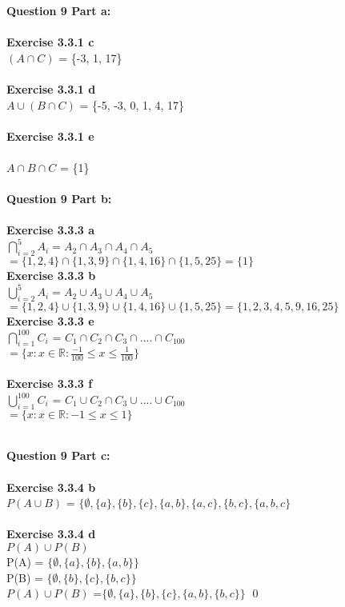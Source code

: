 \documentclass[11pt]{article}
\begin{document}
\noindent \textbf{Question 9 Part a:}\\\\
\textbf{Exercise 3.3.1 c }\\
$(A \cap C)$ = \{-3, 1, 17\}\\\\
\textbf{Exercise 3.3.1 d }\\
$A \cup (B \cap C)$ = \{-5, -3, 0, 1, 4, 17\}\\\\
\textbf{Exercise 3.3.1 e }\\\\
$A \cap B \cap C$ = \{1\}\\\\
\noindent \textbf{Question 9 Part b:}\\\\
\textbf{Exercise 3.3.3 a }\\
$\bigcap ^5_{i=2} A_i = A_2 \cap A_3 \cap A_4 \cap A_5$\\
$=\{1, 2, 4\} \cap \{1, 3, 9\} \cap \{1, 4, 16\} \cap \{1, 5, 25\} = \{1\}$\\
\textbf{Exercise 3.3.3 b }\\
$\bigcup ^5_{i=2} A_i = A_2 \cup A_3 \cup A_4 \cup A_5$\\
$=\{1, 2, 4\} \cup \{1, 3, 9\} \cup \{1, 4, 16\} \cup \{1, 5, 25\} = \{1, 2, 3, 4, 5, 9, 16, 25\}$\\
\textbf{Exercise 3.3.3 e }\\
$\bigcap^{100}_{i=1}C_i$ = $C_1 \cap C_2 \cap C_3 \cap .... \cap C_100 $\\
$= \{x : x \in \mathbb{R}:  \frac{-1}{100} \leq x \leq \frac{1}{100} \}$\\\\
\textbf{Exercise 3.3.3 f }\\
$\bigcup^{100}_{i=1}C_i$ =  $C_1 \cup C_2 \cap C_3 \cup .... \cup C_100 $\\
$= \{x : x \in \mathbb{R}:  -1 \leq x \leq 1 \}$\\\\

\newpage

\noindent \textbf{Question 9 Part c:}\\\\
\textbf{Exercise 3.3.4 b }\\
$P(A\cup B)$ = $\{ \emptyset, \{a\}, \{b\}, \{c\}, \{a, b\}, \{a, c\}, \{b, c\}, \{a, b, c\}$\\\\
\textbf{Exercise 3.3.4 d }\\
$P(A) \cup P(B)$\\
P(A) = $\{ \emptyset, \{a\}, \{b\} , \{a, b\}\}$\\
P(B) = $\{ \emptyset, \{b\}, \{c\} , \{b, c\}\}$\\
$P(A) \cup P(B)$ =$\{ \emptyset, \{a\}, \{b\}, \{c\} , \{a, b\}, \{b, c\}\}$ \qed\\\\
\end{document}
